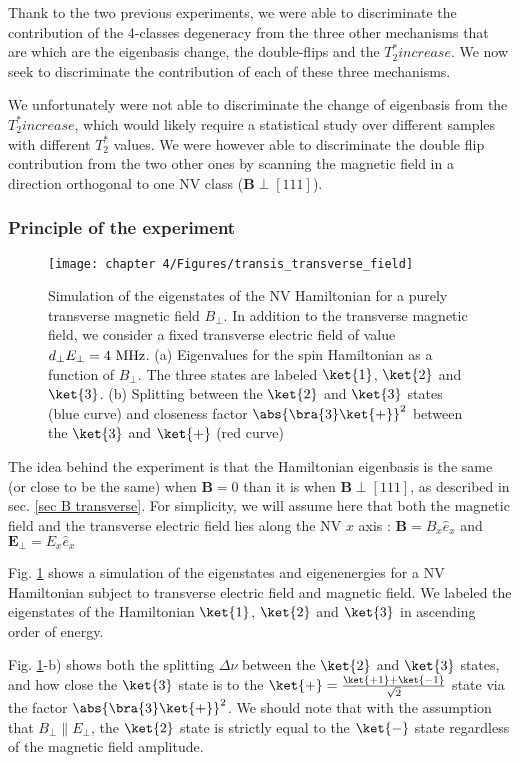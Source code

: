 \documentclass[a4paper, 11pt]{book}
\begin{document}
Thank to the two previous experiments, we were able to discriminate the contribution of the 4-classes degeneracy from the three other mechanisms that are which are the eigenbasis change, the double-flips and the $T_2^* increase$. We now seek to discriminate the contribution of each of these three mechanisms.

We unfortunately were not able to discriminate the change of eigenbasis from the $T_2^* increase$, which would likely require a statistical study over different samples with different $T_2^*$ values. We were however able to discriminate the double flip contribution from the two other ones by scanning the magnetic field in a direction orthogonal to one NV class ($\mathbf{B} \perp [111]$).

\subsubsection{Principle of the experiment}
\begin{figure}[h]
\centering
\texttt{[image: chapter 4/Figures/transis\_transverse\_field]}
\caption{Simulation of the eigenstates of the NV Hamiltonian for  a purely transverse magnetic field $B_\perp$. In addition to the transverse magnetic field, we consider a fixed transverse electric field of value $d_\perp E_\perp=4\ \rm MHz$. (a) Eigenvalues for the spin Hamiltonian as a function of $B_\perp$. The three states are labeled $\ket{1}$, $\ket{2}$ and $\ket{3}$. (b) Splitting between the $\ket{2}$ and $\ket{3}$ states (blue curve) and closeness factor $\abs{\bra{3}\ket{+}}^2$ between the $\ket{3}$ and $\ket{+}$ (red curve)}
\label{eigenstates transverse field}
\end{figure}

The idea behind the experiment is that the Hamiltonian eigenbasis is the same (or close to be the same) when $\mathbf{B}=0$ than it is when $\mathbf{B} \perp [111]$, as described in sec. \ref{sec B transverse}. For simplicity, we will assume here that both the magnetic field and the transverse electric field lies along the NV $x$ axis : $\mathbf{B}=B_x \hat{e}_x$ and $\mathbf{E}_\perp =E_x \hat{e}_x$

Fig. \ref{eigenstates transverse field} shows a simulation of the eigenstates and eigenenergies for a NV Hamiltonian subject to transverse electric field and magnetic field. We labeled the eigenstates of the Hamiltonian $\ket{1}$, $\ket{2}$ and $\ket{3}$ in ascending order of energy.

Fig. \ref{eigenstates transverse field}-b) shows both the splitting $\Delta \nu$ between the $\ket{2}$ and $\ket{3}$ states, and how close the $\ket{3}$ state is to the $\ket{+}=\frac{\ket{+1}+\ket{-1}}{\sqrt{2}}$ state via the factor $\abs{\bra{3}\ket{+}}^2$. We should note that with the assumption that $B_\perp \parallel E_\perp$, the $\ket{2}$ state is strictly equal to the $\ket{-}$ state regardless of the magnetic field amplitude.
\end{document}
